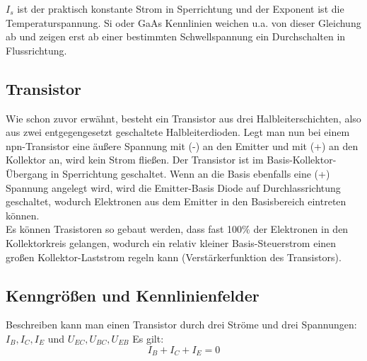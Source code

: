 \documentclass{article}
\begin{document}
\(I_s\) ist der praktisch konstante Strom in Sperrichtung und der Exponent ist die Temperaturspannung. Si oder GaAs Kennlinien weichen u.a. von dieser Gleichung ab und zeigen erst ab einer bestimmten Schwellspannung ein Durchschalten in Flussrichtung.

\subsection{Transistor}
Wie schon zuvor erwähnt, besteht ein Transistor aus drei Halbleiterschichten, also aus zwei entgegengesetzt geschaltete Halbleiterdioden. Legt man nun bei einem npn-Transistor eine äußere Spannung mit (-) an den Emitter und mit (+) an den Kollektor an, wird kein Strom fließen. Der Transistor ist im Basis-Kollektor-Übergang in Sperrichtung geschaltet. Wenn an die Basis ebenfalls eine (+) Spannung angelegt wird, wird die Emitter-Basis Diode auf Durchlassrichtung geschaltet, wodurch Elektronen aus dem Emitter in den Basisbereich eintreten können.\\
Es können Trasistoren so gebaut werden, dass fast 100\(\%\) der Elektronen in den Kollektorkreis gelangen, wodurch ein relativ kleiner Basis-Steuerstrom einen großen Kollektor-Laststrom regeln kann (Verstärkerfunktion des Transistors).

\begin{center}
\begin{minipage}{\linewidth}
\centering
{}
%
\label{transistor}
\end{minipage}
\end{center}

\subsection{Kenngrößen und Kennlinienfelder}
Beschreiben kann man einen Transistor durch drei Ströme und drei Spannungen: \(I_B,I_C,I_E\) und \(U_{EC},U_{BC},U_{EB}\)
Es gilt:
\begin{equation}
I_B+I_C+I_E=0
\end{equation}
\end{document}
